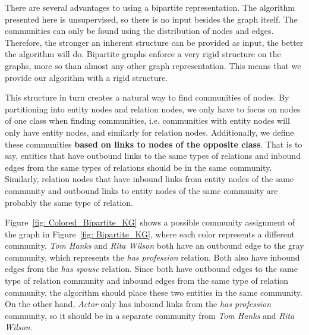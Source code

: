 \documentclass[12pt]{article}
\begin{document}
There are several advantages to using a bipartite representation. The algorithm
presented here is unsupervised, so there is no input besides the graph itself.
The communities can only be found using the distribution of nodes and edges.
Therefore, the stronger an inherent structure can be provided as input, the
better the algorithm will do. Bipartite graphs enforce a very rigid structure on
the graphs, more so than almost any other graph representation. This means that
we provide our algorithm with a rigid structure.

This structure in turn creates a natural way to find communities of nodes. By
partitioning into entity nodes and relation nodes, we only have to focus on
nodes of one class when finding communities, i.e. communities with entity nodes
will only have entity nodes, and similarly for relation nodes. Additionally, we
define these communities \textbf{based on links to nodes of the opposite class}.
That is to say, entities that have outbound links to the same types of relations
and inbound edges from the same types of relations should be in the same
community. Similarly, relation nodes that have inbound links from entity nodes
of the same community and outbound links to entity nodes of the same community
are probably the same type of relation.

Figure~\ref{fig: Colored_Bipartite_KG} shows a possible community assignment of
the graph in Figure~\ref{fig: Bipartite_KG}, where each color represents a
different community. \textit{Tom Hanks} and \textit{Rita Wilson} both have an
outbound edge to the gray community, which represents the \textit{has
profession} relation. Both also have inbound edges from the \textit{has spouse}
relation. Since both have outbound edges to the same type of relation community
and inbound edges from the same type of relation community, the algorithm should
place these two entities in the same community. On the other hand,
\textit{Actor} only has inbound links from the \textit{has profession}
community, so it should be in a separate community from \textit{Tom Hanks} and
\textit{Rita Wilson}.
\end{document}
